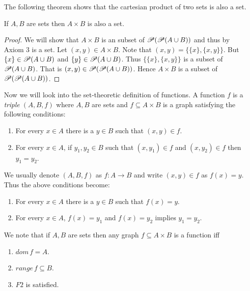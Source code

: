 The following theorem shows that the cartesian product of two sets is also a set.
\begin{Theorem}
    If $A,B$ are sets then $A \times B$ is also a set.
\end{Theorem}
\begin{proof}
    We will show that $A \times B$ is an subset of $\mathscr{P}{\left({\mathscr{P}{\left({A\cup B}\right)}}\right)}$
    and thus by Axiom $3$ is a set.
    Let $(x,y) \in A \times B$. Note that $(x,y) = \lbrace \lbrace x \rbrace, \lbrace x,y \rbrace
    \rbrace$. But $\lbrace x \rbrace \in \mathscr{P}{\left({A \cup B}\right)}$ and $\lbrace y \rbrace \in
    \mathscr{P}{\left({A \cup B}\right)}$.
    Thus $\lbrace \lbrace x \rbrace, \lbrace x,y \rbrace \rbrace$ is a subset of $\mathscr{P}{\left({A\cup B}\right)}$. 
    That is $(x,y) \in \mathscr{P}{\left({\mathscr{P}{\left({A\cup B}\right)}}\right)}$. Hence $A \times B$ is a subset of 
    $\mathscr{P}{\left({\mathscr{P}{\left({A\cup B}\right)}}\right)}$.
\end{proof}

Now we will look into the set-theoretic definition of functions.
A function $f$ is a \emph{triple} $\left(A,B,f\right)$ where $A,B$ are sets and $f \subseteq A
\times B$ is a graph satisfying the following conditions:
\begin{enumerate}[label=\bfseries F \arabic*:]
    \item For every $x \in A$ there is a $y \in B$ such that $(x,y) \in f$.
    \item For every $x \in A$, if $y_1,y_2 \in B$ such that $(x,y_1) \in f$ and $(x,y_2) \in f$ then
	$y_1 = y_2$.
\end{enumerate}

We usually denote $\left(A,B,f\right)$ as $ f : A \to B$ and write $(x,y) \in f$ as $f(x)= y$.
Thus the above conditions become:
\begin{enumerate}[label=\bfseries F \arabic*:]
    \item For every $x \in A$ there is a $y \in B$ such that $f(x) = y$.
    \item For every $x \in A$, $f(x) = y_1 $ and $f(x) = y_2$ implies $y_1 = y_2$. 
\end{enumerate}

We note that if $A,B$ are sets then any graph $f \subseteq A \times B$ is a function iff
\begin{enumerate}
    \item $dom\,f = A$.
    \item $range\,f \subseteq B$.
    \item $F2$ is satisfied.
\end{enumerate}

